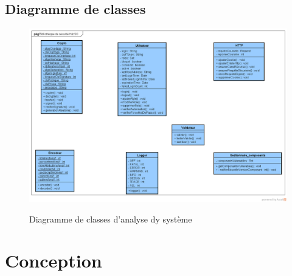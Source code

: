\subsection{Diagramme de classes}
\begin{figure}[H]
	\centering
	\begin{minipage}{12cm}
		\centering
		{\includegraphics[height=0.35\textheight, width=1\textwidth]{fig/Analyse-Class-Diagram.png}}
	\end{minipage}
	\caption{Diagramme de classes d'analyse dy système}
	\label{fig:7.20}
\end{figure}

\section{Conception}
